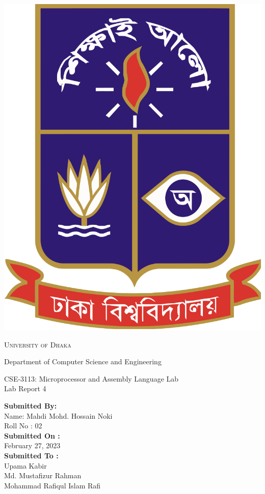 \documentclass{article}
\begin{document}
\begin{titlepage}
	\begin{center}
    	\includegraphics[scale=0.10]{du.png}\par
		\begin{Huge}
			\textsc{University of Dhaka}\par
		\end{Huge}
		\begin{Large}
			Department of Computer Science and Engineering\par \vspace{1cm}
			CSE-3113: Microprocessor and Assembly Language Lab \\[12pt]	
			Lab Report 4\\[8pt]
		\end{Large}
	\end{center}  	
	\begin{large}
		\textbf{Submitted By:\\[12pt]}
			Name: Mahdi Mohd. Hossain Noki\\[8pt]
			Roll No : 02\\[12pt]
		\textbf{Submitted On : \\[12pt]}
			February 27, 2023\\[15pt]
		\textbf{Submitted To :\\[12pt]}
            Upama Kabir\\[10pt]
            Md. Mustafizur Rahman\\[10pt]
            Mohammad Rafiqul Islam Rafi\\[10pt]
                \newpage
	\end{large}
\end{titlepage}
\end{document}
